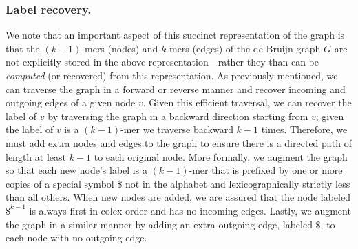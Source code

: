 \subsubsection*{Label recovery.}  We note that an important aspect of this succinct representation of the graph is that the $(k - 1)$-mers (nodes) and $k$-mers (edges) of the de Bruijn graph $G$ are not explicitly stored in the above representation---rather they than can be {\em computed} (or recovered) from this representation.    As previously mentioned, we can traverse the graph in a forward or reverse manner and recover incoming and outgoing edges of a given node $v$.  Given this efficient traversal, we can recover the label of $v$ by traversing the graph in a backward direction starting from $v$;  given the label of $v$ is a $(k - 1)$-mer we traverse backward $k - 1$ times.  Therefore, we must add extra nodes and edges to the graph to ensure there is a directed path of length at least \(k - 1\) to each original node.  More formally, we augment the graph so that each new node's label is a \((k - 1)\)-mer that is prefixed by one or more copies of a special symbol $\$$ not in the alphabet and lexicographically strictly less than all others.  When new nodes are added, we are assured that the node labeled $\$^{k - 1}$ is always first in colex order and has no incoming edges.  Lastly, we augment the graph in a similar manner by adding an extra outgoing edge, labeled $\$$, to each node with no outgoing edge.






